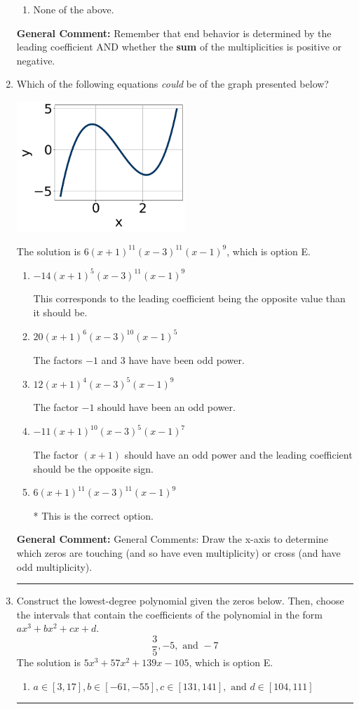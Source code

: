 \documentclass{extbook}[14pt]
\newcommand{\litem}[1]{\item #1

\rule{\textwidth}{0.4pt}}
\begin{document}
\begin{enumerate}
{\begin{enumerate}[label=\Alph*.]
\begin{multicols}{2}
\end{multicols}\item None of the above.\end{enumerate}
\textbf{General Comment:} Remember that end behavior is determined by the leading coefficient AND whether the \textbf{sum} of the multiplicities is positive or negative.
}
\litem{
Which of the following equations \textit{could} be of the graph presented below?

\begin{center}
    \includegraphics[width=0.5\textwidth]{../Figures/polyGraphToFunctionB.png}
\end{center}


The solution is \( 6(x + 1)^{11} (x - 3)^{11} (x - 1)^{9} \), which is option E.\begin{enumerate}[label=\Alph*.]
\item \( -14(x + 1)^{5} (x - 3)^{11} (x - 1)^{9} \)

This corresponds to the leading coefficient being the opposite value than it should be.
\item \( 20(x + 1)^{6} (x - 3)^{10} (x - 1)^{5} \)

The factors $-1$ and $3$ have have been odd power.
\item \( 12(x + 1)^{4} (x - 3)^{5} (x - 1)^{9} \)

The factor $-1$ should have been an odd power.
\item \( -11(x + 1)^{10} (x - 3)^{5} (x - 1)^{7} \)

The factor $(x + 1)$ should have an odd power and the leading coefficient should be the opposite sign.
\item \( 6(x + 1)^{11} (x - 3)^{11} (x - 1)^{9} \)

* This is the correct option.
\end{enumerate}

\textbf{General Comment:} General Comments: Draw the x-axis to determine which zeros are touching (and so have even multiplicity) or cross (and have odd multiplicity).
}
\litem{
Construct the lowest-degree polynomial given the zeros below. Then, choose the intervals that contain the coefficients of the polynomial in the form $ax^3+bx^2+cx+d$.
\[ \frac{3}{5}, -5, \text{ and } -7 \]The solution is \( 5x^{3} +57 x^{2} +139 x -105 \), which is option E.\begin{enumerate}[label=\Alph*.]
\item \( a \in [3, 17], b \in [-61, -55], c \in [131, 141], \text{ and } d \in [104, 111] \)


\end{enumerate}}
\end{enumerate}
\end{document}
